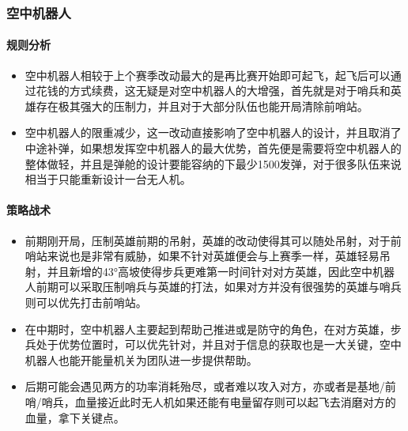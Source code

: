 \subsubsection{空中机器人}

    \paragraph{规则分析}


        \begin{itemize}
            \item 空中机器人相较于上个赛季改动最大的是再比赛开始即可起飞，起飞后可以通过花钱的方式续费，这无疑是对空中机器人的大增强，首先就是对于哨兵和英雄存在极其强大的压制力，并且对于大部分队伍也能开局清除前哨站。
            \item 空中机器人的限重减少，这一改动直接影响了空中机器人的设计，并且取消了中途补弹，如果想发挥空中机器人的最大优势，首先便是需要将空中机器人的整体做轻，并且是弹舱的设计要能容纳的下最少1500发弹，对于很多队伍来说相当于只能重新设计一台无人机。
        \end{itemize}
    
    \paragraph{策略战术}


        \begin{itemize}
            \item 前期刚开局，压制英雄前期的吊射，英雄的改动使得其可以随处吊射，对于前哨站来说也是非常有威胁，如果不针对英雄便会与上赛季一样，英雄轻易吊射，并且新增的43°高坡使得步兵更难第一时间针对对方英雄，因此空中机器人前期可以采取压制哨兵与英雄的打法，如果对方并没有很强势的英雄与哨兵则可以优先打击前哨站。
            \item 在中期时，空中机器人主要起到帮助己推进或是防守的角色，在对方英雄，步兵处于优势位置时，可以优先针对，并且对于信息的获取也是一大关键，空中机器人也能开能量机关为团队进一步提供帮助。
            \item 后期可能会遇见两方的功率消耗殆尽，或者难以攻入对方，亦或者是基地/前哨/哨兵，血量接近此时无人机如果还能有电量留存则可以起飞去消磨对方的血量，拿下关键点。
        \end{itemize}
    
